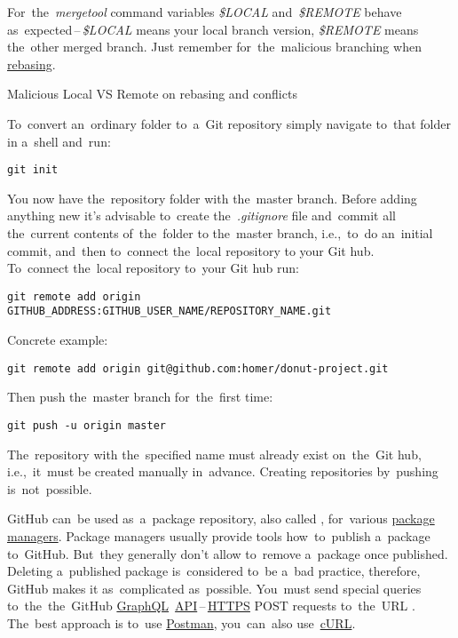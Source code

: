 \note For~the~\textit{mergetool} command variables \textit{\$LOCAL} and~\textit{\$REMOTE} behave as~expected\,--\,\textit{\$LOCAL} means your local branch version, \textit{\$REMOTE} means the~other merged branch.
Just remember for~the~malicious branching when \hyperref[gitrebase]{rebasing}.
\newpage

\label{gitrebase}
\todo Malicious Local VS Remote on rebasing and conflicts

\label{initrepo}
To~convert an~ordinary folder to~a~Git repository simply navigate to~that folder in a~shell and~run:
\begin{lstlisting}[frame=no]
    git init
\end{lstlisting}
\noindent You now have the~repository folder with the~master branch.
Before adding anything new it's advisable to~create the~\textit{.gitignore} file and~commit all the~current contents of~the~folder to the~master branch, i.e.,~to~do an~initial commit, and~then to~connect the~local repository to your Git hub.\\

\noindent To~connect the~local repository to~your Git hub run:
\begin{lstlisting}[frame=no]
    git remote add origin GITHUB_ADDRESS:GITHUB_USER_NAME/REPOSITORY_NAME.git
\end{lstlisting}
\noindent Concrete example:
\begin{lstlisting}[frame=no]
    git remote add origin git@github.com:homer/donut-project.git
\end{lstlisting}
\noindent Then push the~master branch for~the~first time:
\begin{lstlisting}[frame=no]
    git push -u origin master
\end{lstlisting}

\warning The~repository with the~specified name must already exist on~the~Git hub, i.e.,~it~must be created manually in~advance.
Creating repositories by~pushing is~not~possible.

\label{githubdeletepackage}
GitHub can~be used as~a~package repository, also called , for~various \hyperref[packagemanager]{package managers}.
Package managers usually provide tools how~to~publish a~package to~GitHub.
But~they generally don't allow to~remove a~package once published.
Deleting a~published package is~considered to~be a~bad practice, therefore, GitHub makes it as~complicated as~possible.
You~must send special queries to~the~the~GitHub \hyperref[graphql]{GraphQL}~\hyperref[api]{API}\,--\,\hyperref[https]{HTTPS} POST requests to~the~URL .
The~best approach is to~use \href{https://www.getpostman.com/}{Postman}, you~can~also use~\hyperref[curl]{cURL}.

